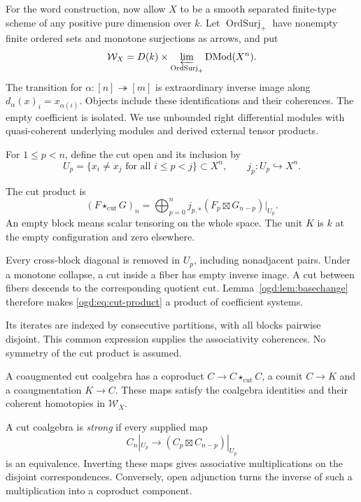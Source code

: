For\label{ogd:def:word-coefficient-category} the word construction, now allow $X$ to be a smooth separated
finite-type scheme of any positive pure dimension over $k$.
Let $\operatorname{OrdSurj}_+$ have
nonempty finite ordered sets and monotone surjections as arrows, and put
\[
 \mathcal W_X=D(k)\times
 \varprojlim_{\operatorname{OrdSurj}_+}\operatorname{DMod}(X^n).
\]
The transition for $\alpha:[n]\twoheadrightarrow[m]$ is extraordinary
inverse image along $d_\alpha(x)_i=x_{\alpha(i)}$.
Objects include these identifications and their coherences. The empty
coefficient is isolated. We use unbounded right differential modules with
quasi-coherent underlying modules and derived external tensor products.

For\label{ogd:def:consecutive-cut-open} $1\leq p<n$, define the cut open and its inclusion by
\[
 U_p=\{x_i\ne x_j\text{ for all }i\leq p<j\}\subset X^n,
 \qquad j_p:U_p\hookrightarrow X^n.
\]

The cut product is
\begin{equation}\label{ogd:eq:cut-product}
 (F\star_{\mathrm{cut}}G)_n
 =\bigoplus_{p=0}^{n}j_{p,*}
       (F_p\boxtimes G_{n-p})|_{U_p}.
\end{equation}
An empty block means scalar tensoring on the whole space.
The unit $K$ is $k$ at the empty configuration and zero elsewhere.

Every cross-block diagonal is removed in $U_p$, including nonadjacent
pairs. Under a monotone collapse, a cut inside a fiber has empty inverse
image. A cut between fibers descends to the corresponding quotient cut.
Lemma~\ref{ogd:lem:basechange} therefore makes
\eqref{ogd:eq:cut-product} a product of coefficient systems.

Its iterates are indexed by consecutive partitions, with all blocks
pairwise disjoint. This common expression supplies the associativity
coherences. No symmetry of the cut product is assumed.

A coaugmented cut coalgebra has a coproduct
$C\to C\star_{\mathrm{cut}}C$, a counit $C\to K$ and a
coaugmentation $K\to C$. These maps satisfy the coalgebra identities
and their coherent homotopies in $\mathcal W_X$.

\label{ogd:def:strong-cut-coalgebra}A cut coalgebra is \emph{strong} if every supplied map
\[
 C_n|_{U_p}\longrightarrow(C_p\boxtimes C_{n-p})|_{U_p}
\]
is an equivalence. Inverting these maps gives associative multiplications
on the disjoint correspondences. Conversely, open adjunction turns the
inverse of such a multiplication into a coproduct component.


